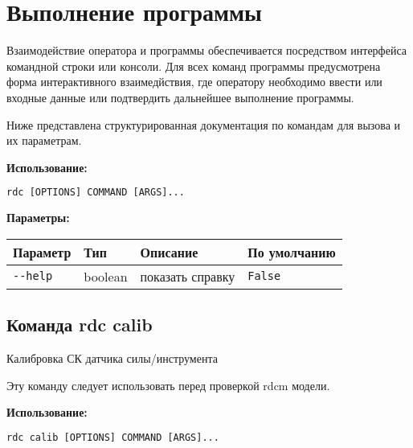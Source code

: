 \newpage
\section{Выполнение программы}

Взаимодействие оператора и программы обеспечивается посредством интерфейса командной строки или консоли.
Для всех команд программы предусмотрена форма интерактивного взаимедйствия, где оператору необходимо ввести или входные данные или подтвердить дальнейшее выполнение программы.

Ниже представлена структурированная документация по командам для вызова и их параметрам.

\textbf{Использование:}
\begin{lstlisting}[language=python, numbers=none, frame=single]
    rdc [OPTIONS] COMMAND [ARGS]...
\end{lstlisting}

\textbf{Параметры:}
\begin{center}
\fontsize{10pt}{10pt}\selectfont
\begin{longtable}[]{p{5cm}|p{2cm}|p{3.5cm}|p{5cm}}
    \hline
\toprule()
Параметр & Тип & Описание & По умолчанию \\
\hline
\midrule()
\endhead
\texttt{-\/-help} & boolean & показать справку &
\texttt{False} \\
\bottomrule()
\hline
\end{longtable}
\end{center}

\hypertarget{rdc-calib}{%
\subsection{Команда rdc calib}\label{rdc-calib}}

Калибровка СК датчика силы/инструмента

Эту команду следует использовать перед проверкой rdcm модели.

\textbf{Использование:}
\begin{lstlisting}[language=python, numbers=none, frame=single]
rdc calib [OPTIONS] COMMAND [ARGS]...
\end{lstlisting}

